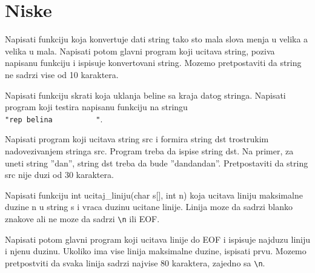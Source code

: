
\section{Niske}



\begin{Exercise}[label=v2.3_01] 
   Napisati funkciju koja konvertuje dati string tako sto 
   mala slova menja u velika a velika u mala. Napisati 
   potom glavni program koji ucitava string, poziva napisanu 
   funkciju i ispisuje konvertovani string. Mozemo pretpostaviti
   da string ne sadrzi vise od 10 karaktera.
\end{Exercise}
\begin{Answer}[ref=v2.3_01]
\end{Answer}

\begin{Exercise}[label=v2.3_02] 
   Napisati funkciju skrati koja uklanja beline sa
   kraja datog stringa. Napisati program koji testira napisanu
   funkciju na stringu\\ \verb|"rep belina          "|.
\end{Exercise}
\begin{Answer}[ref=v2.3_02]
\end{Answer}

\begin{Exercise}[label=v2.3_03] 
   Napisati program koji ucitava string src i formira string dst
   trostrukim nadovezivanjem stringa src. Program treba da ispise
   string dst. Na primer, za uneti string ''dan'', string dst treba
   da bude ''dandandan''. Pretpostaviti da string src nije duzi od
   30 karaktera.
\end{Exercise}
\begin{Answer}[ref=v2.3_03]
\end{Answer}

\begin{Exercise}[label=v2.3_04] 
   Napisati funkciju int ucitaj\_liniju(char s[], int n)
   koja ucitava liniju maksimalne duzine n u string s
   i vraca duzinu ucitane linije. Linija moze da sadrzi
   blanko znakove ali ne moze da sadrzi \verb"\n" ili EOF. 
   
   Napisati potom glavni program koji ucitava linije
   do EOF i ispisuje najduzu liniju i njenu duzinu. Ukoliko
   ima vise linija maksimalne duzine, ispisati prvu. Mozemo
   pretpostviti da svaka linija sadrzi najvise 80 karaktera,
   zajedno sa \verb"\n".
\end{Exercise}
\begin{Answer}[ref=v2.3_04]
\end{Answer}


